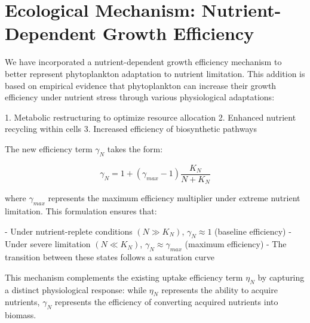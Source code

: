 \section{Ecological Mechanism: Nutrient-Dependent Growth Efficiency}

We have incorporated a nutrient-dependent growth efficiency mechanism to better represent phytoplankton adaptation to nutrient limitation. This addition is based on empirical evidence that phytoplankton can increase their growth efficiency under nutrient stress through various physiological adaptations:

1. Metabolic restructuring to optimize resource allocation
2. Enhanced nutrient recycling within cells
3. Increased efficiency of biosynthetic pathways

The new efficiency term $\gamma_N$ takes the form:

\[ \gamma_N = 1 + (\gamma_{max} - 1) \frac{K_N}{N + K_N} \]

where $\gamma_{max}$ represents the maximum efficiency multiplier under extreme nutrient limitation. This formulation ensures that:

- Under nutrient-replete conditions $(N \gg K_N)$, $\gamma_N \approx 1$ (baseline efficiency)
- Under severe limitation $(N \ll K_N)$, $\gamma_N \approx \gamma_{max}$ (maximum efficiency)
- The transition between these states follows a saturation curve

This mechanism complements the existing uptake efficiency term $\eta_N$ by capturing a distinct physiological response: while $\eta_N$ represents the ability to acquire nutrients, $\gamma_N$ represents the efficiency of converting acquired nutrients into biomass.
